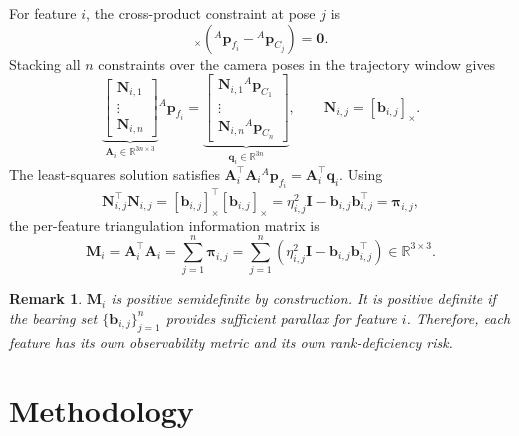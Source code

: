 \documentclass[journal]{IEEEtran}
\newtheorem{remark}{Remark}[section]
\newcommand{\R}{\mathbb{R}}
\newcommand{\sx}[1]{[#1]_{\times}}
\begin{document}
For feature $i$, the cross-product constraint at pose $j$ is
\begin{equation}
  \sx{\bm{b}_{i,j}}
  \left({}^{A}\bm{p}_{f_i}-{}^{A}\bm{p}_{C_j}\right)=\bm{0}.
\end{equation}
Stacking all $n$ constraints over the camera poses in the trajectory window
gives
\begin{equation}
  \underbrace{
  \begin{bmatrix}
  \bm{N}_{i,1}\\
  \vdots\\
  \bm{N}_{i,n}
  \end{bmatrix}}_{\bm{A}_i\in\R^{3n\times3}}
  {}^{A}\bm{p}_{f_i}
  =
  \underbrace{
  \begin{bmatrix}
  \bm{N}_{i,1}{}^{A}\bm{p}_{C_1}\\
  \vdots\\
  \bm{N}_{i,n}{}^{A}\bm{p}_{C_n}
  \end{bmatrix}}_{\bm{q}_i\in\R^{3n}},
  \qquad
  \bm{N}_{i,j}=\sx{\bm{b}_{i,j}}.
\end{equation}
The least-squares solution satisfies
$\bm{A}_{i}^{\top}\bm{A}_{i}{}^{A}\bm{p}_{f_i}
=\bm{A}_{i}^{\top}\bm{q}_{i}$.  Using
\begin{equation}
  \bm{N}_{i,j}^{\top}\bm{N}_{i,j}
  = \sx{\bm{b}_{i,j}}^{\top}\sx{\bm{b}_{i,j}}
  = \eta_{i,j}^{2}\bm{I}
    -\bm{b}_{i,j}\bm{b}_{i,j}^{\top}
  = \bm{\pi}_{i,j},
\end{equation}
the per-feature triangulation information matrix is
\begin{equation}
  \bm{M}_{i}
  = \bm{A}_{i}^{\top}\bm{A}_{i}
  = \sum_{j=1}^{n}\bm{\pi}_{i,j}
  = \sum_{j=1}^{n}\left(\eta_{i,j}^{2}\bm{I}
  -\bm{b}_{i,j}\bm{b}_{i,j}^{\top}\right)
  \in\R^{3\times3}.
  \label{eq:Mi_def}
\end{equation}

\begin{remark}
$\bm{M}_{i}$ is positive semidefinite by construction.  It is positive
definite if the bearing set $\{\bm{b}_{i,j}\}_{j=1}^{n}$ provides sufficient
parallax for feature $i$.  Therefore, each feature has its own observability
metric and its own rank-deficiency risk.
\end{remark}

\section{Methodology}
\label{methodology}
\end{document}
